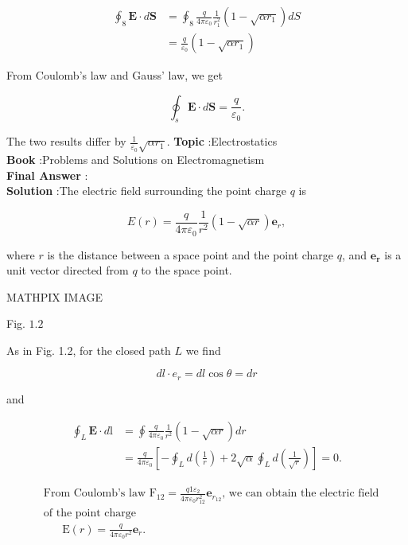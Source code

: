 \documentclass[10pt]{article}
\begin{document}
$$
\begin{aligned}
\oint_{8} \mathbf{E} \cdot d \mathbf{S} &=\oint_{8} \frac{q}{4 \pi \varepsilon_{0}} \frac{1}{r_{1}^{2}}\left(1-\sqrt{\alpha r_{1}}\right) d S \\
&=\frac{q}{\varepsilon_{0}}\left(1-\sqrt{\alpha r_{1}}\right)
\end{aligned}
$$

From Coulomb's law and Gauss' law, we get

$$
\oint_{s} \mathbf{E} \cdot d \mathbf{S}=\frac{q}{\varepsilon_{0}} .
$$

The two results differ by $\frac{1}{\varepsilon_{0}} \sqrt{\alpha r_{1}}$.
\textbf{Topic} :Electrostatics\\
\textbf{Book} :Problems and Solutions on Electromagnetism\\
\textbf{Final Answer} :\\


\textbf{Solution} :The electric field surrounding the point charge $q$ is

$$
E(r)=\frac{q}{4 \pi \varepsilon_{0}} \frac{1}{r^{2}}(1-\sqrt{\alpha r}) \mathbf{e}_{r},
$$

where $r$ is the distance between a space point and the point charge $q$, and $\mathbf{e}_{\boldsymbol{r}}$ is a unit vector directed from $q$ to the space point.

MATHPIX IMAGE

Fig. $1.2$

 As in Fig. 1.2, for the closed path $L$ we find

$$
d l \cdot e_{r}=d l \cos \theta=d r
$$

and

$$
\begin{aligned}
\oint_{L} \mathbf{E} \cdot d \mathrm{l} &=\oint \frac{q}{4 \pi \varepsilon_{0}} \frac{1}{r^{2}}(1-\sqrt{\alpha r}) d r \\
&=\frac{q}{4 \pi \varepsilon_{0}}\left[-\oint_{L} d\left(\frac{1}{r}\right)+2 \sqrt{\alpha} \oint_{L} d\left(\frac{1}{\sqrt{r}}\right)\right]=0 .
\end{aligned}
$$

$$
\begin{aligned}
&\text { From Coulomb's law } \mathrm{F}_{12}=\frac{q 1 \varepsilon_{2}}{4 \pi \varepsilon_{0} r_{12}^{2}} \mathbf{e}_{r_{12}} \text {, we can obtain the electric field } \\
&\text { of the point charge } \\
&\qquad \mathrm{E}(r)=\frac{q}{4 \pi \varepsilon_{0} r^{2}} \mathbf{e}_{r} .
\end{aligned}
$$
\end{document}
